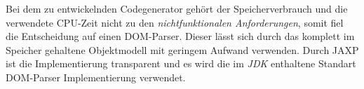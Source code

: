 Bei dem zu entwickelnden Codegenerator gehört der Speicherverbrauch und die verwendete CPU-Zeit nicht zu den \emph{nichtfunktionalen Anforderungen}, somit fiel die Entscheidung auf einen DOM-Parser. Dieser lässt sich durch das komplett im Speicher gehaltene Objektmodell mit geringem Aufwand verwenden. Durch JAXP ist die Implementierung transparent und es wird die im \emph{JDK} enthaltene Standart DOM-Parser Implementierung verwendet.

